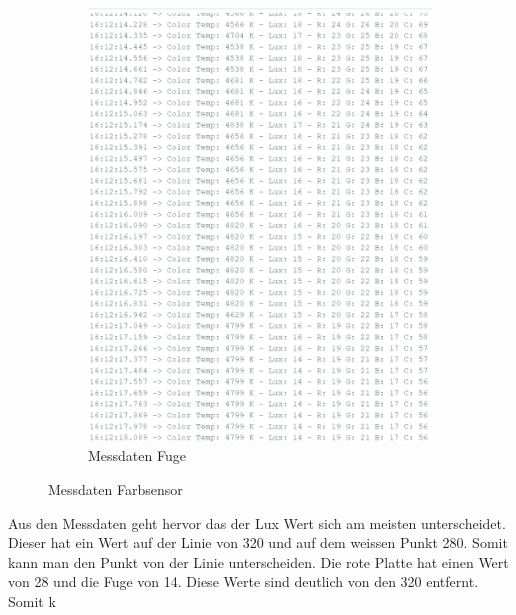 \begin{figure}[H]
\begin{subfigure}{0.35\textwidth}
        \includegraphics[width=\linewidth]{img/sensortest/MD_Fuge_101ms.png}
        \caption{Messdaten Fuge}
        \label{fig:MDFarbsensorFuge}
    \end{subfigure}

    \caption{Messdaten Farbsensor}
    \label{fig:Testanordnungen}
\end{figure}

Aus den Messdaten geht hervor das der Lux Wert sich am meisten unterscheidet. Dieser hat ein Wert auf der Linie von 320 und auf dem weissen Punkt 280. Somit kann man den Punkt von der Linie unterscheiden. Die rote Platte hat einen Wert von 28 und die Fuge von 14. Diese Werte sind deutlich von den 320 entfernt. Somit k

